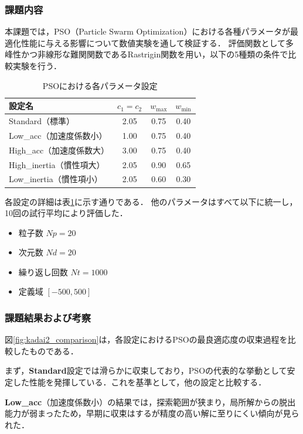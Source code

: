 \subsubsection{課題内容}
本課題では，PSO（Particle Swarm Optimization）における各種パラメータが最適化性能に与える影響について数値実験を通して検証する．
評価関数として多峰性かつ非線形な難関関数であるRastrigin関数を用い，以下の5種類の条件で比較実験を行う．
\begin{table}[H]
    \centering
    \caption{PSOにおける各パラメータ設定}
    \label{tab:pso_param}
    \begin{tabular}{lccc}
      \hline
      設定名 & $c_1 = c_2$ & $w_{\mathrm{max}}$ & $w_{\mathrm{min}}$ \\
      \hline
      Standard（標準） & 2.05 & 0.75 & 0.40 \\
      Low\_acc（加速度係数小） & 1.00 & 0.75 & 0.40 \\
      High\_acc（加速度係数大） & 3.00 & 0.75 & 0.40 \\
      High\_inertia（慣性項大） & 2.05 & 0.90 & 0.65 \\
      Low\_inertia（慣性項小） & 2.05 & 0.60 & 0.30 \\
      \hline
    \end{tabular}
  \end{table}
各設定の詳細は表\ref{tab:pso_param}に示す通りである．  
他のパラメータはすべて以下に統一し，10回の試行平均により評価した．

\begin{itemize}
  \item 粒子数 \(Np = 20\)
  \item 次元数 \(Nd = 20\)
  \item 繰り返し回数 \(Nt = 1000\)
  \item 定義域 \([-500, 500]\)
\end{itemize}

\subsubsection{課題結果および考察}
図\ref{fig:kadai2_comparison}は，各設定におけるPSOの最良適応度の収束過程を比較したものである．

まず，\textbf{Standard}設定では滑らかに収束しており，PSOの代表的な挙動として安定した性能を発揮している．これを基準として，他の設定と比較する．

\textbf{Low\_acc}（加速度係数小）の結果では，探索範囲が狭まり，局所解からの脱出能力が弱まったため，早期に収束はするが精度の高い解に至りにくい傾向が見られた．

